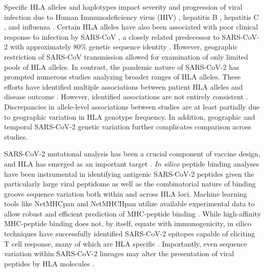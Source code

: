 \documentclass[utf8]{frontiersinFPHY_FAMS} %
\begin{document}
Specific HLA alleles and haplotypes impact severity and progression of viral infection due to Human Immunodeficiency virus (HIV) \citep{22999948, 10073943, 12352262, 21051598}, hepatitis B \citep{27243039, 24842861}, hepatitis C \citep{16571411, 16343061, 18074415}, and influenza \citep{19234171, 11836437, 29315655}. Certain HLA alleles have also been associated with poor clinical response to infection by SARS-CoV \citep{12969506, 32297958}, a closely related predecessor to SARS-CoV-2 with approximately 80\% genetic sequence identity \citep{32027036, 32007145}. However, geographic restriction of SARS-CoV transmission allowed for examination of only limited pools of HLA alleles. In contrast, the pandemic nature of SARS-CoV-2 has prompted numerous studies analyzing broader ranges of HLA alleles. These efforts have identified multiple associations between patient HLA alleles and disease outcome \citep{34490415, 33968060, 33734601, 33298875, 33896121, 34294460, 35960731, 37468623, 37112884, 36627290, 36534127}. However,  identified associations are not entirely consistent \cite{36534127, 38251811}. Discrepancies in allele-level associations between studies are at least partially due to geographic variation in HLA genotype frequency. In addition, geographic and temporal SARS-CoV-2 genetic variation further complicates comparison across studies.  

SARS-CoV-2 mutational analysis has been a crucial component of vaccine design, and HLA has emerged as an important target \citep{32106567, 32269766, 32303592, 32295479, 35577837}. \textit{In silico} peptide binding analyses have been instrumental in identifying antigenic SARS-CoV-2 peptides given the particularly large viral peptidome as well as the combinatorial nature of binding groove sequence variation both within and across HLA loci. Machine learning tools like NetMHCpan and NetMHCIIpan utilize available experimental data to allow robust and efficient prediction of MHC-peptide binding \citep{32406916}. While high-affinity MHC-peptide binding does not, by itself, equate with immunogenicity, in silico techniques have successfully identified SARS-CoV-2 epitopes capable of eliciting T cell response, many of which are HLA specific \citep{33128877, 33853928, 33184509}. Importantly, even sequence variation within SARS-CoV-2 lineages may alter the presentation of viral peptides by HLA molecules \citep{34396391}. 
\end{document}
